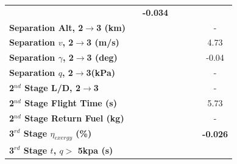 \begin{table}[ht]
\begin{tabular}{l c c c c c c}
	& \textbf{\secondExergyEffmFuelOneHundredTen}
	& \textbf{-0.034}
	\\
	\textbf{Separation Alt, 2$\rightarrow$3 (km)}
	& \secondthirdSeparationAltmFuelNinety
	& \secondthirdSeparationAltmFuelNinetyFive
	& \secondthirdSeparationAltmFuelStandard
	& \secondthirdSeparationAltmFuelOneHundredFive
	& \secondthirdSeparationAltmFuelOneHundredTen
	& -
	\\
	\textbf{Separation $v$, 2$\rightarrow$3 (m/s)}
	& \secondthirdSeparationvmFuelNinety
	& \secondthirdSeparationvmFuelNinetyFive
	& \secondthirdSeparationvmFuelStandard
	& \secondthirdSeparationvmFuelOneHundredFive
	& \secondthirdSeparationvmFuelOneHundredTen
	&4.73
	\\
	\textbf{Separation $\gamma$, 2$\rightarrow$3 (deg)}
	& \secondthirdSeparationgammamFuelNinety
	& \secondthirdSeparationgammamFuelNinetyFive
	& \secondthirdSeparationgammamFuelStandard
	& \secondthirdSeparationgammamFuelOneHundredFive
	& \secondthirdSeparationgammamFuelOneHundredTen
	&-0.04
	\\
	\textbf{Separation $q$, 2$\rightarrow$3(kPa)}
	& \secondthirdSeparationqmFuelNinety
	& \secondthirdSeparationqmFuelNinetyFive
	& \secondthirdSeparationqmFuelStandard
	& \secondthirdSeparationqmFuelOneHundredFive
	& \secondthirdSeparationqmFuelOneHundredTen
	& -
	\\
	\textbf{2$^{nd}$ Stage L/D, 2$\rightarrow$3}
	& \secondthirdSeparationLDmFuelNinety
	& \secondthirdSeparationLDmFuelNinetyFive
	& \secondthirdSeparationLDmFuelStandard
	& \secondthirdSeparationLDmFuelOneHundredFive
	& \secondthirdSeparationLDmFuelOneHundredTen
	& -
	\\
	\textbf{2$^{nd}$ Stage Flight Time (s)}
	& \secondFlightTimemFuelNinety
	& \secondFlightTimemFuelNinetyFive
	& \secondFlightTimemFuelStandard
	& \secondFlightTimemFuelOneHundredFive
	& \secondFlightTimemFuelOneHundredTen
	&5.73
	\\
	\textbf{2$^{nd}$ Stage Return Fuel (kg)}
	& \returnFuelmFuelNinety
	& \returnFuelmFuelNinetyFive
	& \returnFuelmFuelStandard
	& \returnFuelmFuelOneHundredFive
	& \returnFuelmFuelOneHundredTen
	& -
	\\
	\hline 
	\textbf{3$^{rd}$ Stage $\eta_{exergy}$ (\%)}
	& \textbf{\thirddExergyEffmFuelNinety}
	& \textbf{\thirddExergyEffmFuelNinetyFive}
	& \textbf{\thirddExergyEffmFuelStandard}
	& \textbf{\thirddExergyEffmFuelOneHundredFive}
	& \textbf{\thirddExergyEffmFuelOneHundredTen}
	& \textbf{-0.026}
	\\
	\textbf{3$^{rd}$ Stage $t$, $q >$ 5kpa (s)}
	& \thirdqOverFivemFuelNinety

\end{tabular}
\end{table}
